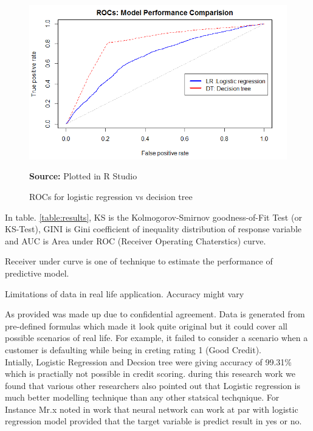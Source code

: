 \begin{center}
\begin{figure}[!htb]
\includegraphics[width=\textwidth]{results1.png}
\centering
\caption{ROCs for logistic regression vs decision tree}{\textbf{Source:} Plotted in R Studio}
\label{fig:result}
\end{figure}
\end{center}

In table. \ref{table:results}, KS is the Kolmogorov-Smirnov goodness-of-Fit Test (or KS-Test), GINI is Gini coefficient of inequality distribution of response variable and AUC is Area under ROC (Receiver Operating Chaterstics) curve.


Receiver under curve is one of technique to estimate the performance of predictive model.

Limitations of data in real life application. Accuracy might vary

As provided was made up due to confidential agreement. Data is generated from pre-defined formulas which made it look quite original but it could cover all possible scenarios of real life. For example, it failed to consider a scenario when a customer is defaulting while being in creting rating 1 (Good Credit). \\

Intially, Logistic Regression and Decsion tree were giving accuracy of 99.31\% which is practially not possible in credit scoring. during this research work we found that various other researchers also pointed out that Logistic regression is much better modelling technique than any other statsical techqnique. For Instance Mr.x noted in work that neural network can work at par with logistic regression model provided that the target variable is predict result in yes or no.\\

